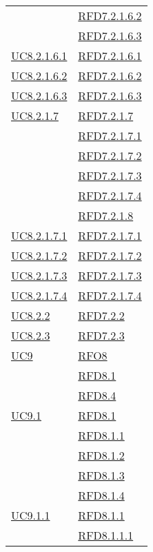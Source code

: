 \begin{longtable}{|>{\centering}m{5cm}|m{5cm}<{\centering}|}
& \hyperlink{RFD7.2.1.6.2}{RFD7.2.1.6.2}\\
& \hyperlink{RFD7.2.1.6.3}{RFD7.2.1.6.3}\\ \hline
\hyperref[UC8.2.1.6.1]{UC8.2.1.6.1} & \hyperlink{RFD7.2.1.6.1}{RFD7.2.1.6.1}\\ \hline
\hyperref[UC8.2.1.6.2]{UC8.2.1.6.2} & \hyperlink{RFD7.2.1.6.2}{RFD7.2.1.6.2}\\ \hline
\hyperref[UC8.2.1.6.3]{UC8.2.1.6.3} & \hyperlink{RFD7.2.1.6.3}{RFD7.2.1.6.3}\\ \hline
\hyperref[UC8.2.1.7]{UC8.2.1.7} & \hyperlink{RFD7.2.1.7}{RFD7.2.1.7}\\
& \hyperlink{RFD7.2.1.7.1}{RFD7.2.1.7.1}\\
& \hyperlink{RFD7.2.1.7.2}{RFD7.2.1.7.2}\\
& \hyperlink{RFD7.2.1.7.3}{RFD7.2.1.7.3}\\
& \hyperlink{RFD7.2.1.7.4}{RFD7.2.1.7.4}\\
& \hyperlink{RFD7.2.1.8}{RFD7.2.1.8}\\ \hline
\hyperref[UC8.2.1.7.1]{UC8.2.1.7.1} & \hyperlink{RFD7.2.1.7.1}{RFD7.2.1.7.1}\\ \hline
\hyperref[UC8.2.1.7.2]{UC8.2.1.7.2} & \hyperlink{RFD7.2.1.7.2}{RFD7.2.1.7.2}\\ \hline
\hyperref[UC8.2.1.7.3]{UC8.2.1.7.3} & \hyperlink{RFD7.2.1.7.3}{RFD7.2.1.7.3}\\ \hline
\hyperref[UC8.2.1.7.4]{UC8.2.1.7.4} & \hyperlink{RFD7.2.1.7.4}{RFD7.2.1.7.4}\\ \hline
\hyperref[UC8.2.2]{UC8.2.2} & \hyperlink{RFD7.2.2}{RFD7.2.2}\\ \hline
\hyperref[UC8.2.3]{UC8.2.3} & \hyperlink{RFD7.2.3}{RFD7.2.3}\\ \hline
\hyperref[UC9]{UC9} & \hyperlink{RFO8}{RFO8}\\
& \hyperlink{RFD8.1}{RFD8.1}\\
& \hyperlink{RFD8.4}{RFD8.4}\\ \hline
\hyperref[UC9.1]{UC9.1} & \hyperlink{RFD8.1}{RFD8.1}\\
& \hyperlink{RFD8.1.1}{RFD8.1.1}\\
& \hyperlink{RFD8.1.2}{RFD8.1.2}\\
& \hyperlink{RFD8.1.3}{RFD8.1.3}\\
& \hyperlink{RFD8.1.4}{RFD8.1.4}\\ \hline
\hyperref[UC9.1.1]{UC9.1.1} & \hyperlink{RFD8.1.1}{RFD8.1.1}\\
& \hyperlink{RFD8.1.1.1}{RFD8.1.1.1}\\

\end{longtable}
